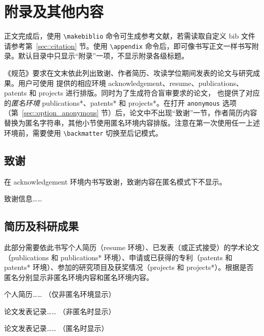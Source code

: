 \documentclass[master]{shtthesis}
\begin{document}
\section{附录及其他内容} \label{sec::backmatter}
正文完成后，使用 \verb|\makebiblio| 命令可生成参考文献，若需读取自定义 bib 文件请参考第~\ref{sec::citation} 节。使用 \verb|\appendix| 命令后，即可像书写正文一样书写附录。默认目录中只显示“附录”一项，不显示附录各级标题。


《规范》要求在文末依此列出致谢、作者简历、攻读学位期间发表的论文与研究成果。用户可使用 \shtthesis{} 提供的相应环境 acknowledgement、resume、publications、patents 和 projects 进行排版。同时为了生成符合盲审要求的论文，\shtthesis{} 也提供了对应的\emph{匿名环境} publications*、patents* 和 projects*。在打开 \verb|anonymous| 选项（第~\ref{sec::option_anonymous} 节）后，论文中不出现“致谢”一节，作者简历内容替换为匿名字符串，其他小节使用匿名环境内容排版。注意在第一次使用任一上述环境前，需要使用 \verb|\backmatter| 切换至后记模式。

\subsection{致谢}
在 acknowledgement 环境内书写致谢，致谢内容在匿名模式下不显示。
\begin{latex}
\begin{acknowledgement}
  致谢信息……
\end{acknowledgement}
\end{latex}

\subsection{简历及科研成果}
此部分需要依此书写个人简历（resume 环境）、已发表（或正式接受）的学术论文（publications 和 publications* 环境）、申请或已获得的专利（patents 和 patents* 环境）、参加的研究项目及获奖情况（projects 和 projects*）。根据是否匿名分别显示非匿名环境内容和匿名环境内容。
\begin{latex}
\begin{resume}
  个人简历…… （仅非匿名环境显示）
\end{resume}

\begin{publications}
  论文发表记录…… （非匿名时显示）
\end{publications}

\begin{publications*}
  论文发表记录…… （匿名时显示）
\end{publications*}
\end{latex}
\end{document}
